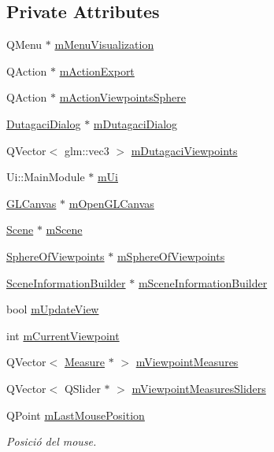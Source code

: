 \subsection*{Private Attributes}
\begin{DoxyCompactItemize}
\item 
Q\+Menu $\ast$ \hyperlink{class_main_module_controller_ae0a0802c4cb12d38f9cbc9a0615a578e}{m\+Menu\+Visualization}
\item 
Q\+Action $\ast$ \hyperlink{class_main_module_controller_a662c14a4582e07bef9405d1db68978e6}{m\+Action\+Export}
\item 
Q\+Action $\ast$ \hyperlink{class_main_module_controller_a44364a535d02eb4a746656beb4f84f06}{m\+Action\+Viewpoints\+Sphere}
\item 
\hyperlink{class_dutagaci_dialog}{Dutagaci\+Dialog} $\ast$ \hyperlink{class_main_module_controller_a945405d748a2575eb69bbc4d0bc97efb}{m\+Dutagaci\+Dialog}
\item 
Q\+Vector$<$ glm\+::vec3 $>$ \hyperlink{class_main_module_controller_a050ae191607a9ebaeb5c9374e091b736}{m\+Dutagaci\+Viewpoints}
\item 
Ui\+::\+Main\+Module $\ast$ \hyperlink{class_main_module_controller_a4f74f8e5ccf69ca6e59ee9b24679a94c}{m\+Ui}
\item 
\hyperlink{class_g_l_canvas}{G\+L\+Canvas} $\ast$ \hyperlink{class_main_module_controller_a4bfb4cd047c46bef7e7de11572c2f2b2}{m\+Open\+G\+L\+Canvas}
\item 
\hyperlink{class_scene}{Scene} $\ast$ \hyperlink{class_main_module_controller_afa8bae45cbf1f607abcbeaaa5083ccec}{m\+Scene}
\item 
\hyperlink{class_sphere_of_viewpoints}{Sphere\+Of\+Viewpoints} $\ast$ \hyperlink{class_main_module_controller_a84400bd617c899fd5d79164f433f6521}{m\+Sphere\+Of\+Viewpoints}
\item 
\hyperlink{class_scene_information_builder}{Scene\+Information\+Builder} $\ast$ \hyperlink{class_main_module_controller_ad2a83274852373c16432907415647178}{m\+Scene\+Information\+Builder}
\item 
bool \hyperlink{class_main_module_controller_a0db94f1a184d51b03241541d2f05d7dc}{m\+Update\+View}
\item 
int \hyperlink{class_main_module_controller_ae9b2750367b1024e3c0abe3e1e8d05d2}{m\+Current\+Viewpoint}
\item 
Q\+Vector$<$ \hyperlink{class_measure}{Measure} $\ast$ $>$ \hyperlink{class_main_module_controller_afa9e3223838f93daeb078139bb56e9b1}{m\+Viewpoint\+Measures}
\item 
Q\+Vector$<$ Q\+Slider $\ast$ $>$ \hyperlink{class_main_module_controller_a6fef830662ec9bfac61cd9c612ca7bf0}{m\+Viewpoint\+Measures\+Sliders}
\item 
Q\+Point \hyperlink{class_main_module_controller_a004c7e340b5a5ab0f825b42f43fdc896}{m\+Last\+Mouse\+Position}
\begin{DoxyCompactList}\small\item\em Posició del mouse. \end{DoxyCompactList}\end{DoxyCompactItemize}
